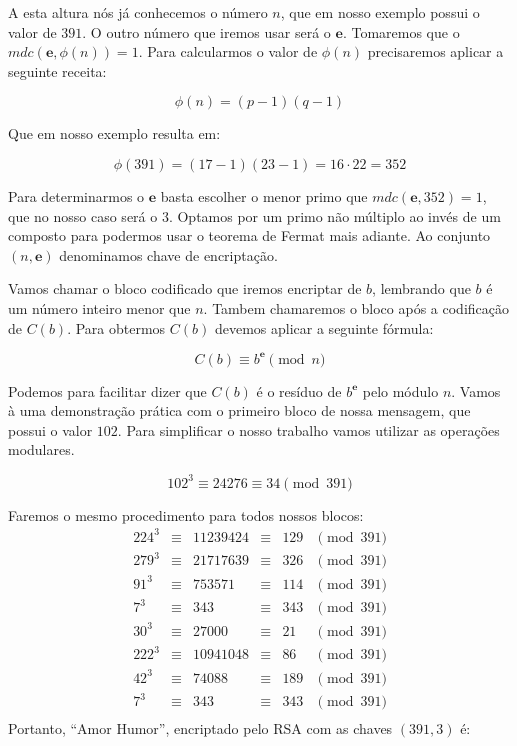 A esta altura n\'os j\'a conhecemos o n\'umero $n$, que em nosso exemplo possui o valor de $391$. O outro n\'umero que iremos usar ser\'a o $\textbf{e}$. Tomaremos que o $mdc(\textbf{e}, \phi(n)) = 1$. Para calcularmos o valor de $\phi(n)$ precisaremos aplicar a seguinte receita:

$$\phi(n) = (p-1)(q-1)$$

Que em nosso exemplo resulta em:

$$\phi(391) = (17 - 1)(23 - 1) = 16 \cdot 22 = 352$$

Para determinarmos o $\textbf{e}$ basta escolher o menor primo que $mdc(\textbf{e}, 352) = 1$, que no nosso caso ser\'a o $3$. Optamos por um primo n\~ao m\'ultiplo ao inv\'es de um composto para podermos usar o teorema de Fermat mais adiante. Ao conjunto $(n, \textbf{e} )$ denominamos chave de encripta\c{c}\~ao.

Vamos chamar o bloco codificado que iremos encriptar de $b$, lembrando que $b$ \'e um n\'umero inteiro menor que $n$. Tambem chamaremos o bloco ap\'os a codifica\c{c}\~ao de $C(b)$. Para obtermos $C(b)$ devemos aplicar a seguinte f\'ormula:

$$C(b) \equiv b^\textbf{e} \pmod{n} $$

Podemos para facilitar dizer que $C(b)$ \'e o res\'iduo de $b^\textbf{e}$ pelo m\'odulo $n$. Vamos \`a uma demonstra\c{c}\~ao pr\'atica com o primeiro bloco de nossa mensagem, que possui o valor $102$. Para simplificar o nosso trabalho vamos utilizar as opera\c{c}\~oes modulares.

$$102^3 \equiv 24276 \equiv 34 \pmod{391}$$

Faremos o mesmo procedimento para todos nossos blocos:
\[
\begin{array}{cccccc}
224^3& \equiv& 11239424& \equiv& 129& \pmod{391}\\
279^3& \equiv& 21717639& \equiv& 326& \pmod{391}\\
91^3&  \equiv& 753571&   \equiv& 114& \pmod{391}\\
7^3&   \equiv& 343&      \equiv& 343& \pmod{391}\\
30^3&  \equiv& 27000&    \equiv& 21&  \pmod{391}\\
222^3& \equiv& 10941048& \equiv& 86&  \pmod{391}\\
42^3&  \equiv& 74088&    \equiv& 189& \pmod{391}\\
7^3&   \equiv& 343&      \equiv& 343& \pmod{391}\\
\end{array}
\]
Portanto, ``Amor Humor'', encriptado pelo RSA com as chaves $(391 , 3)$ \'e: 

